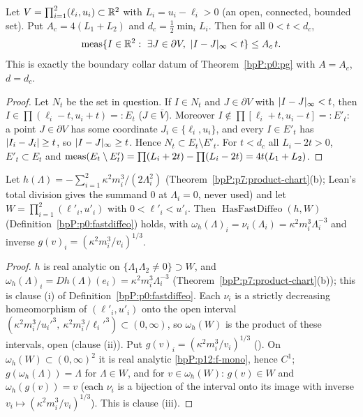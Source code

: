 \begin{lemma}\label{bpP:p12:collar}
Let $V=\prod_{i=1}^2(\ell_i,u_i)\subset\mathbb{R}^2$ with $L_i=u_i-\ell_i>0$ (an open, connected, bounded set). Put $A_c=4(L_1+L_2)$ and $d_c=\tfrac12\min_iL_i$. Then for all $0<t<d_c$,
\[\meas\{I\in\R^2:\ \exists J\in\partial V,\ \abs{I-J}_\infty<t\}\le A_c\,t .\]
This is exactly the boundary collar datum of Theorem~\ref{bpP:p0:pg} with $A=A_c$, $d=d_c$.
\end{lemma}
\begin{proof}
\label{stepP:p12:co-inc} Let $N_t$ be the set in question. If $I\in N_t$ and $J\in\partial V$ with $\lvert I-J\rvert_\infty<t$, then $I\in\prod(\ell_i-t,u_i+t)=:E_t$ ($J\in\overline V$). Moreover $I\notin\prod[\ell_i+t,u_i-t]=:E'_t$: a point $J\in\partial V$ has some coordinate $J_i\in\{\ell_i,u_i\}$, and every $I\in E'_t$ has $\lvert I_i-J_i\rvert\ge t$, so $\lvert I-J\rvert_\infty\ge t$. Hence $N_t\subset E_t\setminus E'_t$.
\label{stepP:p12:co-meas} For $t<d_c$ all $L_i-2t>0$, $E'_t\subset E_t$ and
$\operatorname{meas}(E_t\setminus E'_t)=\prod(L_i+2t)-\prod(L_i-2t)=4t(L_1+L_2)$.
\end{proof}

\begin{lemma}\label{bpP:p12:fast-diffeo}
Let $h(\Lambda)=-\sum_{i=1}^2\kappa^2m_i^3/(2\Lambda_i^2)$ (Theorem~\ref{bpP:p7:product-chart}(b); Lean's total division gives the summand $0$ at $\Lambda_i=0$, never used) and let $W=\prod_{i=1}^2(\ell'_i,u'_i)$ with $0<\ell'_i<u'_i$. Then $\operatorname{HasFastDiffeo}(h,W)$ (Definition~\ref{bpP:p0:fastdiffeo}) holds, with $\omega_h(\Lambda)_i=\nu_i(\Lambda_i)=\kappa^2m_i^3\Lambda_i^{-3}$ and inverse $g(v)_i=(\kappa^2m_i^3/v_i)^{1/3}$.
\end{lemma}
\begin{proof}
\label{stepP:p12:fd-an} $h$ is real analytic on $\{\Lambda_1\Lambda_2\ne0\}\supset W$, and $\omega_h(\Lambda)_i=Dh(\Lambda)(e_i)=\kappa^2m_i^3\Lambda_i^{-3}$ (Theorem~\ref{bpP:p7:product-chart}(b)); this is clause (i) of Definition~\ref{bpP:p0:fastdiffeo}.
\label{stepP:p12:fd-open} Each $\nu_i$ is a strictly decreasing homeomorphism of $(\ell'_i,u'_i)$ onto the open interval $(\kappa^2m_i^3/u_i'^3,\ \kappa^2m_i^3/\ell_i'^3)\subset(0,\infty)$, so $\omega_h(W)$ is the product of these intervals, open (clause (ii)).
\label{stepP:p12:fd-inv} Put $g(v)_i=(\kappa^2m_i^3/v_i)^{1/3}$ (). On $\omega_h(W)\subset(0,\infty)^2$ it is real analytic \ref{bpP:p12:f-mono}, hence $C^1$; $g(\omega_h(\Lambda))=\Lambda$ for $\Lambda\in W$, and for $v\in\omega_h(W)$: $g(v)\in W$ and $\omega_h(g(v))=v$ (each $\nu_i$ is a bijection of the interval onto its image with inverse $v_i\mapsto(\kappa^2m_i^3/v_i)^{1/3}$). This is clause (iii).
\end{proof}


